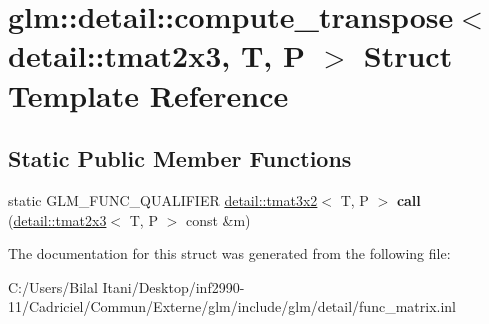 \hypertarget{structglm_1_1detail_1_1compute__transpose_3_01detail_1_1tmat2x3_00_01_t_00_01_p_01_4}{}\section{glm\+:\+:detail\+:\+:compute\+\_\+transpose$<$ detail\+:\+:tmat2x3, T, P $>$ Struct Template Reference}
\label{structglm_1_1detail_1_1compute__transpose_3_01detail_1_1tmat2x3_00_01_t_00_01_p_01_4}
\subsection*{Static Public Member Functions}
\begin{DoxyCompactItemize}
\item 
static G\+L\+M\+\_\+\+F\+U\+N\+C\+\_\+\+Q\+U\+A\+L\+I\+F\+I\+ER \hyperlink{structglm_1_1detail_1_1tmat3x2}{detail\+::tmat3x2}$<$ T, P $>$ {\bfseries call} (\hyperlink{structglm_1_1detail_1_1tmat2x3}{detail\+::tmat2x3}$<$ T, P $>$ const \&m)\hypertarget{structglm_1_1detail_1_1compute__transpose_3_01detail_1_1tmat2x3_00_01_t_00_01_p_01_4_a4eb080988185ee66f639a17c9a6f548d}{}\label{structglm_1_1detail_1_1compute__transpose_3_01detail_1_1tmat2x3_00_01_t_00_01_p_01_4_a4eb080988185ee66f639a17c9a6f548d}

\end{DoxyCompactItemize}


The documentation for this struct was generated from the following file\+:\begin{DoxyCompactItemize}
\item 
C\+:/\+Users/\+Bilal Itani/\+Desktop/inf2990-\/11/\+Cadriciel/\+Commun/\+Externe/glm/include/glm/detail/func\+\_\+matrix.\+inl\end{DoxyCompactItemize}
